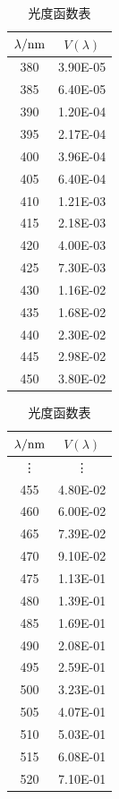\begin{table}[H]
\caption{光度函数表}\label{tab:lumtab}

\hfil
\begin{minipage}{0.19\textwidth}
\begin{tabular}{cc}
\toprule
$\lambda/{\rm nm}$ & $V(\lambda)$ \\
\midrule
380 & 3.90E-05 \\
385 & 6.40E-05 \\
390 & 1.20E-04 \\
395 & 2.17E-04 \\
400 & 3.96E-04 \\
405 & 6.40E-04 \\
410 & 1.21E-03 \\
415 & 2.18E-03 \\
420 & 4.00E-03 \\
425 & 7.30E-03 \\
430 & 1.16E-02 \\
435 & 1.68E-02 \\
440 & 2.30E-02 \\
445 & 2.98E-02 \\
450 & 3.80E-02 \\
\bottomrule
\end{tabular}
\end{minipage}
\begin{minipage}{0.19\textwidth}
\begin{tabular}{cc}
\toprule
$\lambda/{\rm nm}$ & $V(\lambda)$ \\
\midrule
\vdots & \vdots\\
455 & 4.80E-02 \\
460 & 6.00E-02 \\
465 & 7.39E-02 \\
470 & 9.10E-02 \\
475 & 1.13E-01 \\
480 & 1.39E-01 \\
485 & 1.69E-01 \\
490 & 2.08E-01 \\
495 & 2.59E-01 \\
500 & 3.23E-01 \\
505 & 4.07E-01 \\
510 & 5.03E-01 \\
515 & 6.08E-01 \\
520 & 7.10E-01 \\
\bottomrule
\end{tabular}
\end{minipage}
\begin{minipage}{0.19\textwidth}

\end{minipage}
\end{table}
